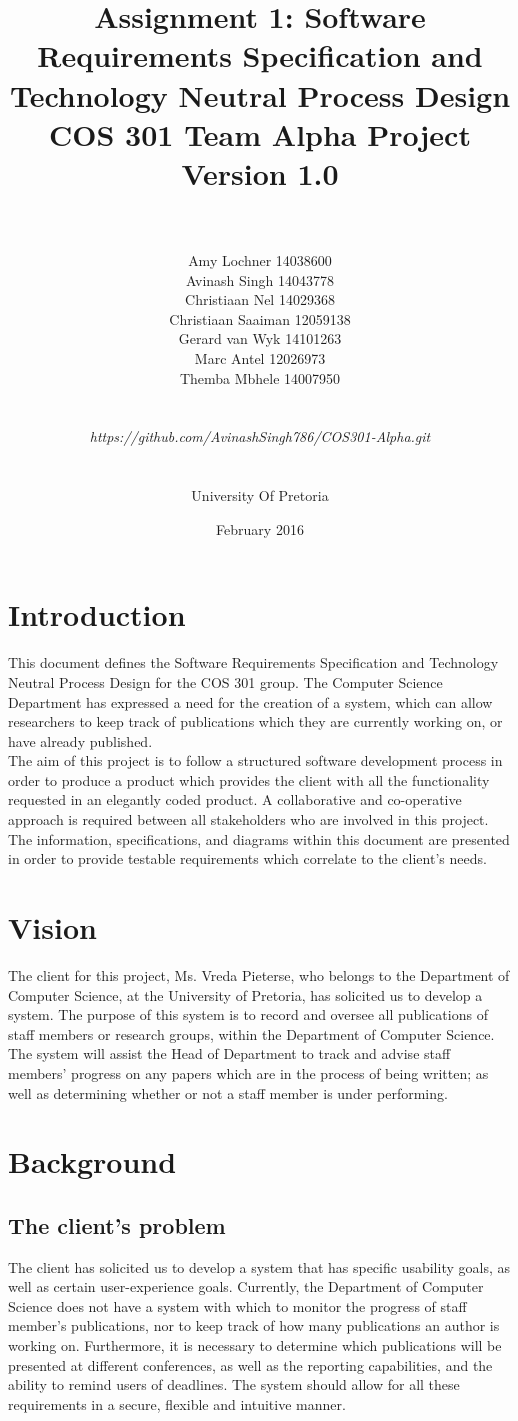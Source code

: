 \documentclass[a4paper]{article}
\title{\huge Assignment 1: Software Requirements Specification and Technology Neutral Process Design
	\\COS 301 Team Alpha Project
	\\Version 1.0}
\author{\\\\Amy Lochner 14038600\\ Avinash Singh 14043778 \\
	Christiaan Nel 14029368\\ Christiaan Saaiman 12059138 \\
	Gerard van Wyk 14101263\\ Marc Antel 12026973\\
	Themba Mbhele 14007950
	\\
	\\
	\\\textit{https://github.com/AvinashSingh786/COS301-Alpha.git}
	\\
	\\
	\\ University Of Pretoria\\}
\date{February 2016}
\begin{document}
	
	\maketitle

	\newpage

	\tableofcontents
	\newpage
	
	\section{Introduction}
	
	This document defines the Software Requirements Specification and Technology Neutral Process Design for the COS 301 group. The Computer Science Department has expressed a need for the creation of a system, which can allow researchers to keep track of publications which they are currently working on, or have already published.
	\\
	The aim of this project is to follow a structured software development process in order to produce a product which provides the client with all the functionality requested in an elegantly coded product. A collaborative and co-operative approach is required between all stakeholders who are involved in this project. 
	\\
	The information, specifications, and diagrams within this document are presented in order to provide testable requirements which correlate to the client's needs.
	
	\section{Vision}
	The client for this project, Ms. Vreda Pieterse, who belongs to the Department of Computer Science, at the University of Pretoria, has solicited us to develop a system. The purpose of this system is to record and oversee all publications of staff members or research groups, within the Department of Computer Science. The system will assist the Head of Department to track and advise staff members' progress on any papers which are in the process of being written; as well as determining whether or not a staff member is under performing.
	
	\section{Background}
	\subsection{The client's problem}
	The client has solicited us to develop a system that has specific usability goals, as well as certain user-experience goals. Currently, the Department of Computer Science does not have a system with which to monitor the progress of staff member's publications, nor to keep track of how many publications an author is working on. Furthermore, it is necessary to determine which publications will be presented at different conferences, as well as the reporting capabilities, and the ability to remind users of deadlines. The system should allow for all these requirements in a secure, flexible and intuitive manner.
	
\end{document}

